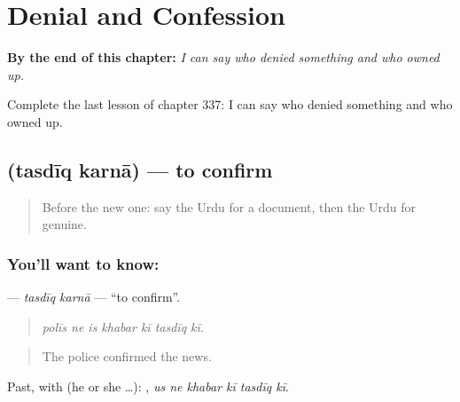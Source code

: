 
\chapter{Denial and Confession}
\label{ch:ur-denial-and-confession}

\begin{chapteropening}
\textbf{By the end of this chapter:} \emph{I can say who denied something and who owned up.}

Complete the last lesson of chapter 337: I can say who denied something and who owned up.
\end{chapteropening}

\section[\texorpdfstring{\ur{تصدیق} \ur{کرنا} (tasdīq karnā)}{تصدیق کرنا (tasdīq karnā)}]{  (tasdīq karnā) — to confirm}

\label{lesson:UR-C337-tasdiq-karna}



\begin{quote}
Before the new one: say the Urdu for a document, then the Urdu for genuine.
\end{quote}

\subsection*{You'll want to know:  }
\textbf{ } — \emph{tasdīq karnā} — \textquotedblleft{}to confirm\textquotedblright{}.

\begin{quote}
      
\end{quote}

\begin{quote}
\emph{polīs ne is khabar kī tasdīq kī.}
\end{quote}

\begin{quote}
The police confirmed the news.
\end{quote}

Past, with  (he or she …):      , \emph{us ne khabar kī tasdīq kī}.

